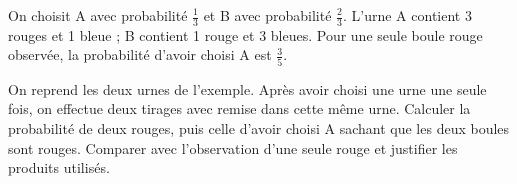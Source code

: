 \documentclass[11pt]{article}
\begin{document}
On choisit A avec probabilité \(\frac{1}{3}\) et B avec probabilité \(\frac{2}{3}\). L’urne A contient 3 rouges et 1 bleue ; B contient 1 rouge et 3 bleues. Pour une seule boule rouge observée, la probabilité d’avoir choisi A est \(\frac{3}{5}\).\par
\vspace{5pt}
On reprend les deux urnes de l’exemple. Après avoir choisi une urne une seule fois, on effectue deux tirages avec remise dans cette même urne. Calculer la probabilité de deux rouges, puis celle d’avoir choisi A sachant que les deux boules sont rouges. Comparer avec l’observation d’une seule rouge et justifier les produits utilisés.\par
\vspace{5pt}
\end{document}
